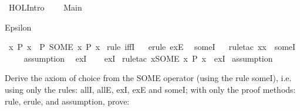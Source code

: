 %
\begin{isabellebody}%
%
%
\isadelimtheory
%
\endisadelimtheory
%
\isatagtheory
{}\isamarkupfalse%
\ HOL{\isacharunderscore}{\kern0pt}Intro\ \isanewline
\ \ \ Main\ \isanewline
{}%
\endisatagtheory
{\isafoldtheory}%
%
\isadelimtheory
%
\endisadelimtheory
%
\isadelimdocument
%
\endisadelimdocument
%
\isatagdocument
%
\isamarkuptrue%
%
\isamarkuptrue%
%
\endisatagdocument
{\isafolddocument}%
%
\isadelimdocument
%
\endisadelimdocument
%
\begin{isamarkuptext}%
Epsilon%
\end{isamarkuptext}\isamarkuptrue%
\isamarkupfalse%
\ {\isachardoublequoteopen}{\isacharparenleft}{\kern0pt}{\isasymexists}x{\isachardot}{\kern0pt}\ P\ x{\isacharparenright}{\kern0pt}\ {\isacharequal}{\kern0pt}\ P\ {\isacharparenleft}{\kern0pt}SOME\ x{\isachardot}{\kern0pt}\ P\ x{\isacharparenright}{\kern0pt}{\isachardoublequoteclose}\isanewline
%
\isadelimproof
%
\endisadelimproof
%
\isatagproof
{}\isamarkupfalse%
\ {\isacharparenleft}{\kern0pt}rule\ iffI{\isacharparenright}{\kern0pt}\isanewline
\ \isamarkupfalse%
\ {\isacharparenleft}{\kern0pt}erule\ exE{\isacharparenright}{\kern0pt}\ \isamarkupfalse%
\ someI\isanewline
\ \isamarkupfalse%
\ {\isacharparenleft}{\kern0pt}rule{\isacharunderscore}{\kern0pt}tac\ x{\isacharequal}{\kern0pt}x\ \ someI{\isacharparenright}{\kern0pt}\isanewline
\ \ \ \isamarkupfalse%
\ assumption\ \isamarkupfalse%
\ exI\isanewline
\ \ \isamarkupfalse%
\ exI\isanewline
{}\isamarkupfalse%
\ {\isacharparenleft}{\kern0pt}rule{\isacharunderscore}{\kern0pt}tac\ x{\isacharequal}{\kern0pt}{\isachardoublequoteopen}SOME\ x{\isachardot}{\kern0pt}\ P\ x{\isachardoublequoteclose}\ \ exI{\isacharparenright}{\kern0pt}\isanewline
{}\isamarkupfalse%
\ assumption\isanewline
{}\isamarkupfalse%
%
\endisatagproof
{\isafoldproof}%
%
\isadelimproof
%
\endisadelimproof
%
\begin{isamarkuptext}%
Derive the axiom of choice from the SOME operator (using the rule someI), i.e.
using only the rules: allI, allE, exI, exE and someI; with only the
proof methods: rule, erule,  and assumption, prove:%

\end{isamarkuptext}
\end{isabellebody}
